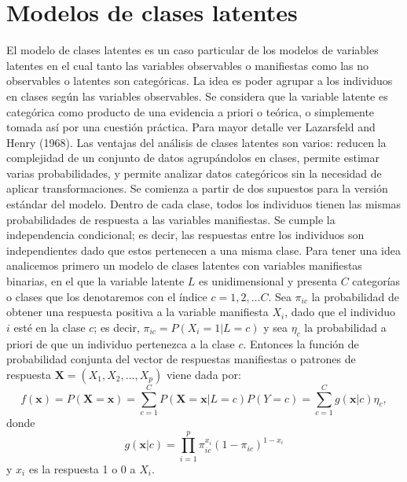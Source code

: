 	\section{Modelos de clases latentes}
		El modelo de clases latentes es un caso particular de los modelos de variables latentes en el cual tanto las variables observables o manifiestas como las no observables o latentes son categ\'{o}ricas. La idea es poder agrupar a los individuos en clases seg\'{u}n las variables observables. Se considera que la variable latente es categ\'{o}rica como producto de una evidencia a priori o te\'{o}rica, o simplemente tomada as\'{i} por una cuesti\'{o}n pr\'{a}ctica. Para mayor detalle ver Lazarsfeld and Henry (1968).
		Las ventajas del an\'{a}lisis de clases latentes son varios: reducen la complejidad de un conjunto de datos agrup\'{a}ndolos en clases, permite estimar varias probabilidades, y permite analizar datos categ\'{o}ricos sin la necesidad de aplicar transformaciones.
		Se comienza a partir de dos supuestos para la versi\'{o}n est\'{a}ndar del modelo. Dentro de cada clase, todos los individuos tienen las mismas probabilidades de respuesta a las variables manifiestas.
		Se cumple la independencia condicional; es decir, las respuestas entre los individuos son independientes dado que estos pertenecen a una misma clase.
		Para tener una idea analicemos primero un modelo de clases latentes con variables manifiestas binarias, en el que la variable latente $L$ es unidimensional y presenta $C$ categor\'{i}as o clases que los denotaremos con el \'{i}ndice $c=1,2,\ldots C$. Sea ${ \pi  }_{ ic }$ la probabilidad de obtener una respuesta positiva a la variable manifiesta $ X_{ i }$, dado que el individuo $i$ est\'{e} en la clase $c$; es decir, $\pi_{i c}=P\left(X_{i}=1 | L=c\right)$ y sea ${ \eta  }_{ c }$ la probabilidad a priori de que un individuo pertenezca a la clase $c$. Entonces la funci\'{o}n de probabilidad conjunta del vector de respuestas manifiestas o patrones de respuesta $\boldsymbol{X}=( X_{ 1 }, X_{ 2 },\ldots , X_p)$ viene dada por:
		\begin{equation}
			f(\mathbf{x}) = P(\mathbf{X}=\mathbf{x}) = \sum_{c=1}^{C} P(\mathbf{X}=\mathbf{x} | L=c ) P(Y=c) = \sum_{c=1}^{C} g(\mathbf{x} | c) \eta_{c},
			\label{2.1}
		\end{equation}
		donde
		\begin{equation}
			g(\mathbf{x} | c) = \prod_{i=1}^{p} \pi_{ic}^{x_{i}}\left(1-\pi_{i c}\right)^{1-x_{i}}
			\label{2.2}
		\end{equation}
		y $x_{i}$ es la respuesta 1 o 0 a $X_{i}$.\\
		
